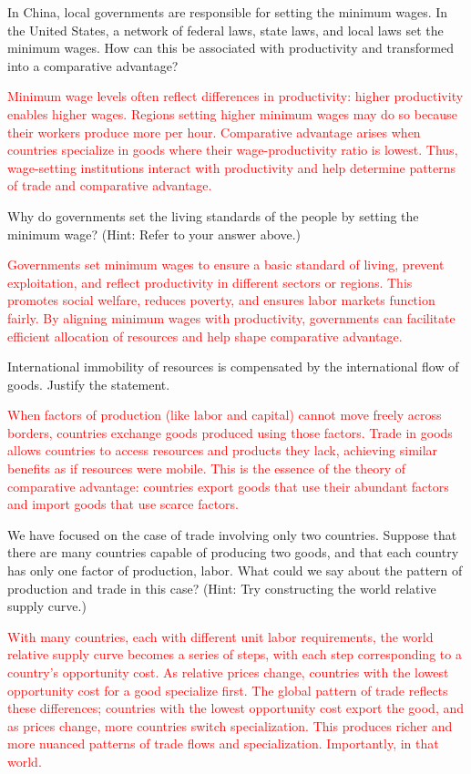 \documentclass[11pt,letterpaper]{exam}
\begin{document}
\begin{questions}
\question In China, local governments are responsible for setting the minimum wages. In the United States, a network of federal laws, state laws, and local laws set the minimum wages. How can this be associated with productivity and transformed into a comparative advantage?

\textcolor{red}{
Minimum wage levels often reflect differences in productivity: higher productivity enables higher wages. Regions setting higher minimum wages may do so because their workers produce more per hour. Comparative advantage arises when countries specialize in goods where their wage-productivity ratio is lowest. Thus, wage-setting institutions interact with productivity and help determine patterns of trade and comparative advantage.
}

\question Why do governments set the living standards of the people by setting the minimum wage? (Hint: Refer to your answer above.)

\textcolor{red}{
Governments set minimum wages to ensure a basic standard of living, prevent exploitation, and reflect productivity in different sectors or regions. This promotes social welfare, reduces poverty, and ensures labor markets function fairly. By aligning minimum wages with productivity, governments can facilitate efficient allocation of resources and help shape comparative advantage.
}

\question International immobility of resources is compensated by the international flow of goods. Justify the statement.

\textcolor{red}{
When factors of production (like labor and capital) cannot move freely across borders, countries exchange goods produced using those factors. Trade in goods allows countries to access resources and products they lack, achieving similar benefits as if resources were mobile. This is the essence of the theory of comparative advantage: countries export goods that use their abundant factors and import goods that use scarce factors.
}

\question We have focused on the case of trade involving only two countries. Suppose that there are many countries capable of producing two goods, and that each country has only one factor of production, labor. What could we say about the pattern of production and trade in this case? (Hint: Try constructing the world relative supply curve.)

\textcolor{red}{
With many countries, each with different unit labor requirements, the world relative supply curve becomes a series of steps, with each step corresponding to a country's opportunity cost. As relative prices change, countries with the lowest opportunity cost for a good specialize first. The global pattern of trade reflects these differences; countries with the lowest opportunity cost export the good, and as prices change, more countries switch specialization. This produces richer and more nuanced patterns of trade flows and specialization. Importantly, in that world.
}



\end{questions}
\end{document}
